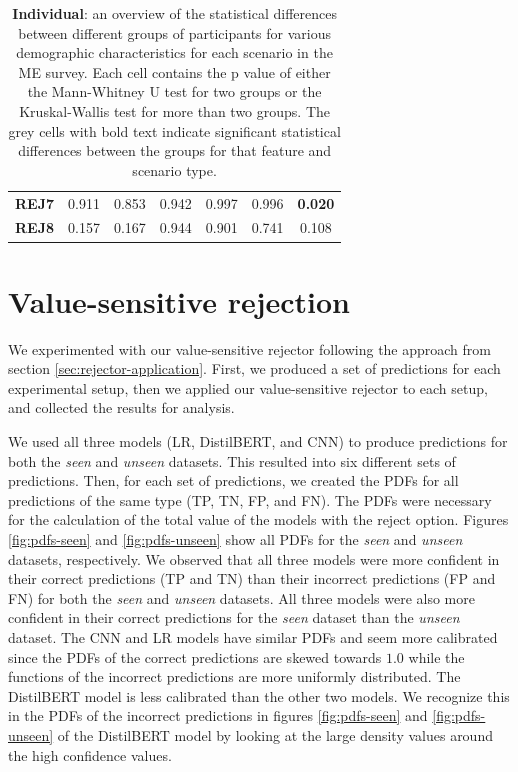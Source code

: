 \begin{table}
\begin{tabular}{lccc|ccc}
        \textbf{REJ7} & 0.911                                   & 0.853                                             & 0.942                                  & 0.997                                    & 0.996                                  & \cellcolor[HTML]{EFEFEF}\textbf{0.020} \\
        \textbf{REJ8} & 0.157                                   & 0.167                                             & 0.944                                  & 0.901                                    & 0.741                                  & 0.108                                  \\
        \bottomrule
    \end{tabular}
    \caption{\textbf{Individual}: an overview of the statistical differences between different groups of participants for various demographic characteristics for each scenario in the ME survey. Each cell contains the p value of either the Mann-Whitney U test for two groups or the Kruskal-Wallis test for more than two groups. The grey cells with bold text indicate significant statistical differences between the groups for that feature and scenario type.}
    \label{tab:results-differences-ind}
\end{table}

\section{Value-sensitive rejection}
\label{sec:results-rejector}
We experimented with our value-sensitive rejector following the approach from section \ref{sec:rejector-application}.
%
First, we produced a set of predictions for each experimental setup, then we applied our value-sensitive rejector to each setup, and collected the results for analysis.
%

%
We used all three models (LR, DistilBERT, and CNN) to produce predictions for both the \emph{seen} and \emph{unseen} datasets.
%
This resulted into six different sets of predictions.
%
Then, for each set of predictions, we created the PDFs for all predictions of the same type (TP, TN, FP, and FN).
%
The PDFs were necessary for the calculation of the total value of the models with the reject option.
%
Figures \ref{fig:pdfs-seen} and \ref{fig:pdfs-unseen} show all PDFs for the \emph{seen} and \emph{unseen} datasets, respectively.
%
We observed that all three models were more confident in their correct predictions (TP and TN) than their incorrect predictions (FP and FN) for both the \emph{seen} and \emph{unseen} datasets.
%
All three models were also more confident in their correct predictions for the \emph{seen} dataset than the \emph{unseen} dataset.
%
The CNN and LR models have similar PDFs and seem more calibrated since the PDFs of the correct predictions are skewed towards $1.0$ while the functions of the incorrect predictions are more uniformly distributed.
%
The DistilBERT model is less calibrated than the other two models.
%
We recognize this in the PDFs of the incorrect predictions in figures \ref{fig:pdfs-seen} and \ref{fig:pdfs-unseen} of the DistilBERT model by looking at the large density values around the high confidence values.
%

